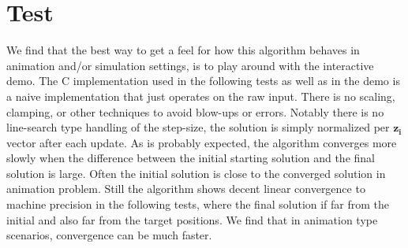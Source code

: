 \documentclass[14pt]{extarticle}
\newcommand*{\vv}[1]{\mathbf{#1}}
\begin{document}
\section{Test}
We find that the best way to get a feel for how this algorithm behaves in
animation and/or simulation settings, is to play around with the interactive
demo. The C implementation used in the following tests as well as in the demo is
a naive
implementation that just operates on the raw input. There is no scaling,
clamping, or other techniques to avoid blow-ups or errors. Notably there is no
line-search type handling of the step-size, the solution is simply
normalized per $\vv{z_i}$ vector after each update. As is probably expected, the
algorithm converges
more slowly when the difference between the initial starting solution and the
final solution is large. Often the initial solution is close to the converged
solution in animation problem. Still the algorithm shows decent linear
convergence to machine precision in the following tests, where the final
solution if far from the initial and also far from the target positions. We find
that in animation type scenarios, convergence can be much faster.
\end{document}
